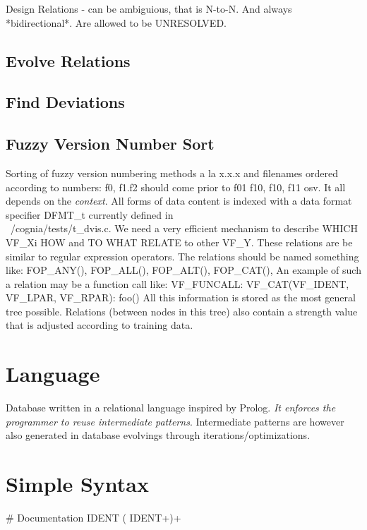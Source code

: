 \documentclass[a4paper,10pt,twocolumn]{article}
\begin{document}
Design Relations - can be ambiguious, that is N-to-N. And always
*bidirectional*. Are allowed to be UNRESOLVED.

\subsection{Evolve Relations}

\subsection{Find Deviations}

\subsection{Fuzzy Version Number Sort}

Sorting of fuzzy version numbering methods a la x.x.x and filenames ordered
according to numbers: f0, f1.f2 should come prior to f01 f10, f10, f11 osv. It
all depends on the \emph{context}.  All forms of data content is indexed with a
data format specifier DFMT_t currently defined in
\\~{}{}/cognia/tests/t_dvis.c.  We need a very efficient mechanism to describe
WHICH VF_Xi HOW and TO WHAT RELATE to other VF_Y. These relations are be
similar to regular expression operators. The relations should be named something
like: FOP_ANY(), FOP_ALL(), FOP_ALT(), FOP_CAT(), An example of such a
relation may be a function call like: VF_FUNCALL: VF_CAT(VF_IDENT, VF_LPAR,
VF_RPAR): foo() All this information is stored as the most general tree
possible. Relations (between nodes in this tree) also contain a strength value
that is adjusted according to training data.

\section{Language}

Database written in a relational language inspired by Prolog.  \emph{It enforces
  the programmer to reuse intermediate patterns}.  Intermediate patterns are
however also generated in database evolvings through iterations/optimizations.

\section{Simple Syntax}

\# Documentation
IDENT (
IDENT+)+
\end{document}
